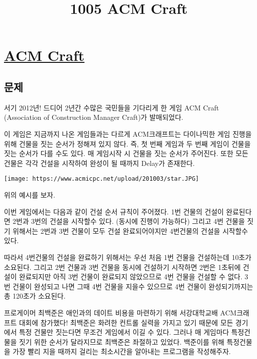 \documentclass[11pt]{article}
\title{1005 ACM Craft}
\makeatletter
\def\maxwidth{\ifdim\Gin@nat@width>\linewidth\linewidth
    \else\Gin@nat@width\fi}
\let\Oldincludegraphics\includegraphics
\renewcommand{\includegraphics}[1]{\Oldincludegraphics[width=.8\maxwidth]{#1}}
\makeatother
\begin{document}
    
    
    \maketitle
    
    

    
    \hypertarget{acm-craft}{%
\section{\texorpdfstring{\href{https://www.acmicpc.net/problem/1005}{ACM
Craft}}{ACM Craft}}\label{acm-craft}}

\hypertarget{uxbb38uxc81c}{%
\subsection{문제}\label{uxbb38uxc81c}}

서기 2012년! 드디어 2년간 수많은 국민들을 기다리게 한 게임 ACM Craft
(Association of Construction Manager Craft)가 발매되었다.

이 게임은 지금까지 나온 게임들과는 다르게 ACM크래프트는 다이나믹한 게임
진행을 위해 건물을 짓는 순서가 정해져 있지 않다. 즉, 첫 번째 게임과 두
번째 게임이 건물을 짓는 순서가 다를 수도 있다. 매 게임시작 시 건물을
짓는 순서가 주어진다. 또한 모든 건물은 각각 건설을 시작하여 완성이 될
때까지 Delay가 존재한다.

\texttt{[image: https://www.acmicpc.net/upload/201003/star.JPG]}

위의 예시를 보자.

이번 게임에서는 다음과 같이 건설 순서 규칙이 주어졌다. 1번 건물의 건설이
완료된다면 2번과 3번의 건설을 시작할수 있다. (동시에 진행이 가능하다)
그리고 4번 건물을 짓기 위해서는 2번과 3번 건물이 모두 건설
완료되어야지만 4번건물의 건설을 시작할수 있다.

따라서 4번건물의 건설을 완료하기 위해서는 우선 처음 1번 건물을
건설하는데 10초가 소요된다. 그리고 2번 건물과 3번 건물을 동시에 건설하기
시작하면 2번은 1초뒤에 건설이 완료되지만 아직 3번 건물이 완료되지
않았으므로 4번 건물을 건설할 수 없다. 3번 건물이 완성되고 나면 그때 4번
건물을 지을수 있으므로 4번 건물이 완성되기까지는 총 120초가 소요된다.

프로게이머 최백준은 애인과의 데이트 비용을 마련하기 위해 서강대학교배
ACM크래프트 대회에 참가했다! 최백준은 화려한 컨트롤 실력을 가지고 있기
때문에 모든 경기에서 특정 건물만 짓는다면 무조건 게임에서 이길 수 있다.
그러나 매 게임마다 특정건물을 짓기 위한 순서가 달라지므로 최백준은
좌절하고 있었다. 백준이를 위해 특정건물을 가장 빨리 지을 때까지 걸리는
최소시간을 알아내는 프로그램을 작성해주자.
\end{document}
